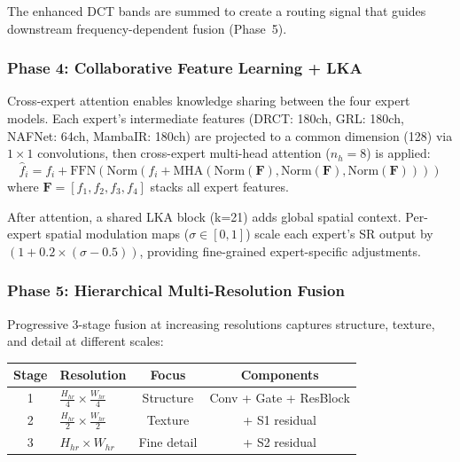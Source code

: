 \documentclass[10pt,twocolumn,letterpaper]{article}
\begin{document}
The enhanced DCT bands are summed to create a routing signal that guides downstream frequency-dependent fusion (Phase~5).

\subsubsection{Phase 4: Collaborative Feature Learning + LKA}

Cross-expert attention enables knowledge sharing between the four expert models. Each expert's intermediate features (DRCT: 180ch, GRL: 180ch, NAFNet: 64ch, MambaIR: 180ch) are projected to a common dimension (128) via $1\times 1$ convolutions, then cross-expert multi-head attention ($n_h=8$) is applied:
\begin{equation}
\hat{f}_i = f_i + \text{FFN}\!\left(\text{Norm}\!\left(f_i + \text{MHA}(\text{Norm}(\mathbf{F}), \text{Norm}(\mathbf{F}), \text{Norm}(\mathbf{F}))\right)\right)
\end{equation}
where $\mathbf{F} = [f_1, f_2, f_3, f_4]$ stacks all expert features.

After attention, a shared LKA block (k=21) adds global spatial context. Per-expert spatial modulation maps ($\sigma \in [0,1]$) scale each expert's SR output by $(1 + 0.2 \times (\sigma - 0.5))$, providing fine-grained expert-specific adjustments.

\subsubsection{Phase 5: Hierarchical Multi-Resolution Fusion}

Progressive 3-stage fusion at increasing resolutions captures structure, texture, and detail at different scales:

\begin{table}[h]
\centering
\small
\begin{tabular}{@{}clcc@{}}
\toprule
\textbf{Stage} & \textbf{Resolution} & \textbf{Focus} & \textbf{Components} \\
\midrule
1 & $\frac{H_{hr}}{4} \times \frac{W_{hr}}{4}$ & Structure & Conv + Gate + ResBlock \\
2 & $\frac{H_{hr}}{2} \times \frac{W_{hr}}{2}$ & Texture & + S1 residual \\
3 & $H_{hr} \times W_{hr}$ & Fine detail & + S2 residual \\
\bottomrule
\end{tabular}
\end{table}
\end{document}
